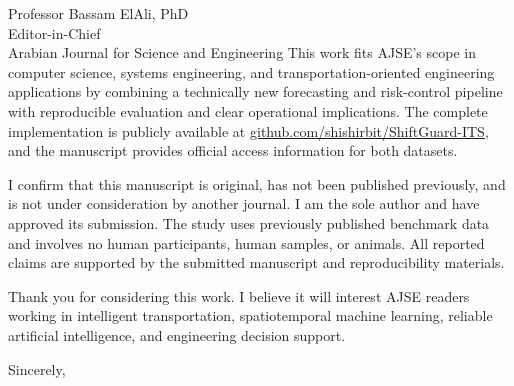 \documentclass[10pt]{letter}
\begin{document}
\begin{letter}{Professor Bassam ElAli, PhD\\
Editor-in-Chief\\
Arabian Journal for Science and Engineering}
This work fits AJSE's scope in computer science, systems engineering, and
transportation-oriented engineering applications by combining a technically
new forecasting and risk-control pipeline with reproducible evaluation and
clear operational implications. The complete implementation is publicly
available at \href{https://github.com/shishirbit/ShiftGuard-ITS}{github.com/shishirbit/ShiftGuard-ITS},
and the manuscript provides official access information for both datasets.

I confirm that this manuscript is original, has not been published previously,
and is not under consideration by another journal. I am the sole author and
have approved its submission. The study uses previously published benchmark
data and involves no human participants, human samples, or animals. All
reported claims are supported by the submitted manuscript and reproducibility
materials.

Thank you for considering this work. I believe it will interest AJSE readers
working in intelligent transportation, spatiotemporal machine learning,
reliable artificial intelligence, and engineering decision support.

\closing{Sincerely,}

\end{letter}
\end{document}

